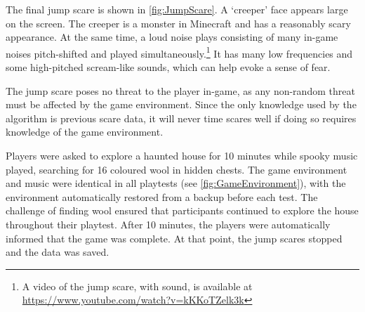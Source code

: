 \documentclass[12pt,a4paper]{article}\usepackage[]{graphicx}\usepackage[]{color}
\begin{document}
The final jump scare is shown in \vref{fig:JumpScare}.
A `creeper' face appears large on the screen.
The creeper is a monster in Minecraft and has a reasonably scary appearance.
At the same time, a loud noise plays consisting of many in-game noises pitch-shifted and played simultaneously.\footnote{A video of the jump scare, with sound, is available at \url{https://www.youtube.com/watch?v=kKKoTZelk3k}}
It has many low frequencies and some high-pitched scream-like sounds, which can help evoke a sense of fear.

The jump scare poses no threat to the player in-game, as any non-random threat must be affected by the game environment.
Since the only knowledge used by the algorithm is previous scare data, it will never time scares well if doing so requires knowledge of the game environment.

Players were asked to explore a haunted house for 10 minutes while spooky music played, searching for 16 coloured wool in hidden chests.
The game environment and music were identical in all playtests (see \vref{fig:GameEnvironment}), with the environment automatically restored from a backup before each test.
The challenge of finding wool ensured that participants continued to explore the house throughout their playtest.
After 10 minutes, the players were automatically informed that the game was complete.
At that point, the jump scares stopped and the data was saved.
\end{document}
